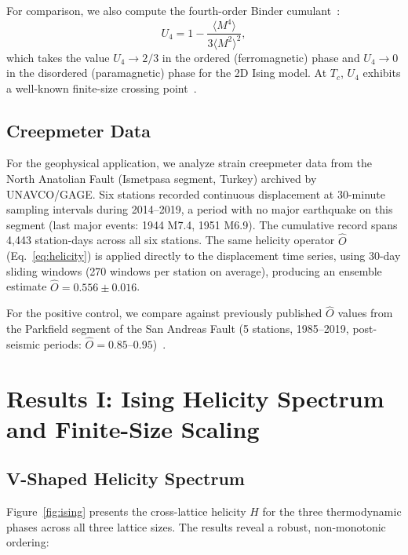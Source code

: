 \documentclass[aps,prl,twocolumn,superscriptaddress,byrevtex]{article}
\begin{document}
For comparison, we also compute the fourth-order Binder cumulant~\cite{binder1981}:
\begin{equation}
U_4 = 1 - \frac{\langle M^4 \rangle}{3\langle M^2 \rangle^2},
\label{eq:binder}
\end{equation}
which takes the value $U_4 \to 2/3$ in the ordered (ferromagnetic) phase and $U_4 \to 0$
in the disordered (paramagnetic) phase for the 2D Ising model. At $T_c$, $U_4$
exhibits a well-known finite-size crossing point~\cite{binder1981,landau2014}.

\subsection{Creepmeter Data}

For the geophysical application, we analyze strain creepmeter data from the North
Anatolian Fault (Ismetpasa segment, Turkey) archived by UNAVCO/GAGE. Six stations
recorded continuous displacement at 30-minute sampling intervals during 2014--2019,
a period with no major earthquake on this segment (last major events: 1944 M7.4,
1951 M6.9). The cumulative record spans 4,443 station-days across all six stations.
The same helicity operator $\hat{O}$ (Eq.~\ref{eq:helicity}) is applied directly to
the displacement time series, using 30-day sliding windows (270 windows per station
on average), producing an ensemble estimate $\hat{O} = 0.556 \pm 0.016$.

For the positive control, we compare against previously published $\hat{O}$ values
from the Parkfield segment of the San Andreas Fault (5 stations, 1985--2019,
post-seismic periods: $\hat{O} = 0.85$--$0.95$)~\cite{dr2026}.

\section{Results I: Ising Helicity Spectrum and Finite-Size Scaling}

\subsection{V-Shaped Helicity Spectrum}

Figure~\ref{fig:ising} presents the cross-lattice helicity $H$ for the three
thermodynamic phases across all three lattice sizes. The results reveal a robust,
non-monotonic ordering:
\end{document}
